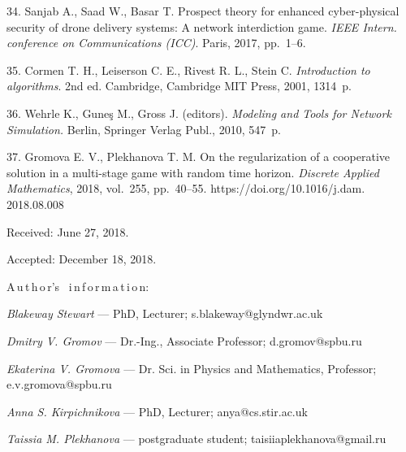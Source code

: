 {34. Sanjab A., Saad W., Basar T. Prospect theory for enhanced
cyber-physical security of drone delivery systems: A network
interdiction game. {\em IEEE Intern. conference on Communications
(ICC)}. Paris, 2017, pp.~1--6.

35. Cormen T. H., Leiserson C. E.,  Rivest R. L., Stein C.
\textit{Introduction to algorithms}. 2nd ed. Cambridge, Cambridge
MIT Press, 2001, 1314~p.

36. Wehrle K., Gune\c{s} M., Gross J. (editors). \textit{Modeling
and Tools for Network Simulation.} Berlin, Springer Verlag Publ.,
2010, 547~p.

37. Gromova E. V., Plekhanova T. M. On the regularization of a
cooperative solution in a multi-\linebreak stage game with random
time horizon. {\em Discrete Applied Mathematics}, 2018, vol.~255,
pp.~40--55. https://doi.org/10.1016/j.dam. 2018.08.008


\vskip 1.5mm

%

Received:  June 27, 2018.

Accepted: December 18, 2018.

\vskip6mm A\,u\,t\,h\,o\,r's \ i\,n\,f\,o\,r\,m\,a\,t\,i\,o\,n:

\vskip1.5mm\textit{Blakeway Stewart} --- PhD, Lecturer;
s.blakeway@glyndwr.ac.uk

\vskip1.5mm\textit{Dmitry V. Gromov} --- Dr.-Ing., Associate
Professor; d.gromov@spbu.ru

\vskip1.5mm\textit{Ekaterina V. Gromova} --- Dr. Sci. in  Physics
and Mathematics, Professor; e.v.gromova@spbu.ru

\vskip1.5mm\textit{Anna S. Kirpichnikova} --- PhD, Lecturer;
anya@cs.stir.ac.uk

\vskip2mm\textit{Taissia M. Plekhanova} --- postgraduate student;
taisiiaplekhanova@gmail.ru


}
